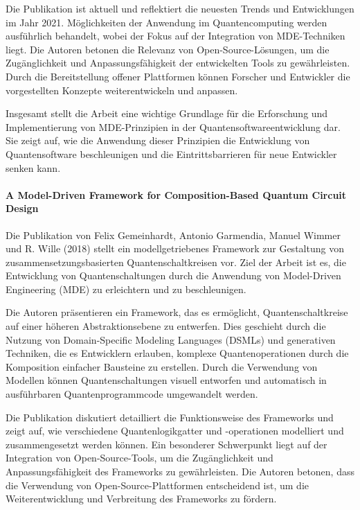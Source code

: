 Die Publikation ist aktuell und reflektiert die neuesten Trends und Entwicklungen im Jahr 2021. Möglichkeiten der Anwendung 
im Quantencomputing werden ausführlich behandelt, wobei der Fokus auf der Integration von MDE-Techniken liegt. 
Die Autoren betonen die Relevanz von Open-Source-Lösungen, um die Zugänglichkeit und Anpassungsfähigkeit der 
entwickelten Tools zu gewährleisten. Durch die Bereitstellung offener Plattformen können Forscher und Entwickler 
die vorgestellten Konzepte weiterentwickeln und anpassen.

Insgesamt stellt die Arbeit eine wichtige Grundlage für die Erforschung und Implementierung von MDE-Prinzipien 
in der Quantensoftwareentwicklung dar. Sie zeigt auf, wie die Anwendung dieser Prinzipien die Entwicklung von 
Quantensoftware beschleunigen und die Eintrittsbarrieren für neue Entwickler senken kann.

\paragraph{A Model-Driven Framework for Composition-Based Quantum Circuit Design}

Die Publikation von Felix Gemeinhardt, Antonio Garmendia, Manuel Wimmer und R. Wille (2018) \cite{Gemeinhardt_2018}
stellt ein modellgetriebenes Framework zur Gestaltung von zusammensetzungsbasierten Quantenschaltkreisen vor. Ziel der Arbeit 
ist es, die Entwicklung von Quantenschaltungen durch die Anwendung von Model-Driven Engineering (MDE) zu erleichtern und zu beschleunigen.

Die Autoren präsentieren ein Framework, das es ermöglicht, Quantenschaltkreise auf einer höheren Abstraktionsebene zu entwerfen. 
Dies geschieht durch die Nutzung von Domain-Specific Modeling Languages (DSMLs) und generativen Techniken, die 
es Entwicklern erlauben, komplexe Quantenoperationen durch die Komposition einfacher Bausteine zu erstellen. 
Durch die Verwendung von Modellen können Quantenschaltungen visuell entworfen und automatisch in ausführbaren Quantenprogrammcode umgewandelt werden.

Die Publikation diskutiert detailliert die Funktionsweise des Frameworks und zeigt auf, wie verschiedene 
Quantenlogikgatter und -operationen modelliert und zusammengesetzt werden können. Ein besonderer Schwerpunkt liegt auf 
der Integration von Open-Source-Tools, um die Zugänglichkeit und Anpassungsfähigkeit des Frameworks zu gewährleisten. 
Die Autoren betonen, dass die Verwendung von Open-Source-Plattformen entscheidend ist, um die Weiterentwicklung und Verbreitung des Frameworks zu fördern.

